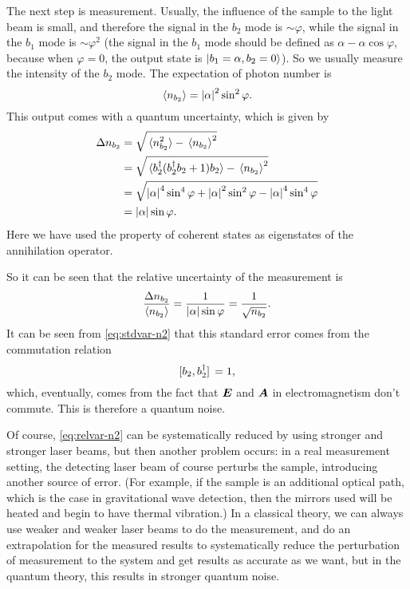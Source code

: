 \documentclass[hyperref, a4paper]{article}
\begin{document}
The next step is measurement.
Usually, the influence of the sample to the light beam is small,
and therefore the signal in the $b_2$ mode is $\sim \varphi$,
while the signal in the $b_1$ mode is $\sim \varphi^2$
(the signal in the $b_1$ mode should be defined as $\alpha - \alpha \cos \varphi$,
because when $\varphi = 0$, the output state is $\ket{b_1 = \alpha, b_2 = 0}$).
So we usually measure the intensity of the $b_2$ mode.
The expectation of photon number is 
\begin{equation}
    \expval{n_{b_2}} = \abs{\alpha}^2 \sin^2 \varphi.
\end{equation}
This output comes with a quantum uncertainty, which is given by 
\begin{equation}
    \begin{aligned}
        \Delta n_{b_2} &= \sqrt{ \expval*{n_{b_2}^2} - \expval*{n_{b_2}}^2 } \\
        &= \sqrt{ \expval*{ b_2^\dagger (b_2^\dagger b_2 + 1) b_2} - \expval*{n_{b_2}}^2 } \\
        &= \sqrt{ \abs{\alpha}^4 \sin^4 \varphi + \abs{\alpha}^2 \sin^2 \varphi - \abs{\alpha}^4 \sin^4 \varphi } \\
        &= \abs{\alpha} \sin \varphi.
    \end{aligned}
    \label{eq:stdvar-n2}
\end{equation}
Here we have used the property of coherent states as eigenstates of the annihilation operator.

So it can be seen that the relative uncertainty of the measurement is 
\begin{equation}
    \frac{\Delta n_{b_2}}{\expval{n_{b_2}}} = \frac{1}{\abs{\alpha} \sin \varphi} = \frac{1}{\sqrt{n_{b_2}}}.
    \label{eq:relvar-n2}
\end{equation}
It can be seen from \eqref{eq:stdvar-n2} that this standard error comes from the commutation relation 
\begin{equation}
    \comm*{b_2}{b_2^\dagger} = 1,
\end{equation}
which, eventually, comes from the fact that $\vb*{E}$ and $\vb*{A}$ in electromagnetism don't commute.
This is therefore a quantum noise.

Of course, \eqref{eq:relvar-n2} can be systematically reduced by using stronger and stronger laser beams,
but then another problem occurs:
in a real measurement setting,
the detecting laser beam of course perturbs the sample,
introducing another source of error.
(For example, if the sample is an additional optical path,
which is the case in gravitational wave detection,
then the mirrors used will be heated
and begin to have thermal vibration.)
In a classical theory,
we can always use weaker and weaker laser beams to do the measurement,
and do an extrapolation for the measured results
to systematically reduce the perturbation of measurement to the system
and get results as accurate as we want,
but in the quantum theory,
this results in stronger quantum noise.
\end{document}
